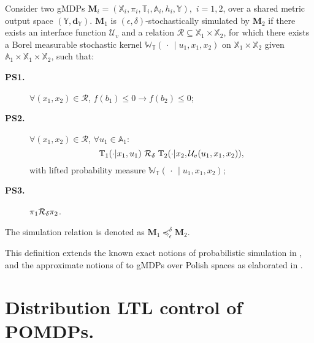 \documentclass{ifacconf}
\newcommand{\X}{{\mathbb{X}}}
\newcommand{\Y}{{\mathbb{Y}}}
\newcommand{\U}{{\mathbb{A}}}
\newcommand{\A}{{\U}}
\newcommand{\InF}{\mathcal{U}_{v}}
\newcommand{\Wt}{\mathbb{W}_{\mathbb{T}}}
\newcommand{\M}{{\mathbf{M}}}
\newcommand{\eps}{\epsilon} \newcommand{\rel}{\mathcal{R}} %
\begin{document}
%
\begin{definition}\label{def:apbsim}
	Consider two gMDPs $\M_i=(\X_i,\pi_i ,\mathbb T_i,\A_i,h_i,\Y),$ $i =1,2$,  over a shared {metric} output space  $(\Y,\mathbf{d}_\Y)$.
	$\M_1$ is $(\epsilon,\delta)$-stochastically simulated by $\M_2$ if there exists an interface function $\InF$ and
	a relation $\rel\subseteq \X_1\times \X_2$, for which there exists a Borel measurable stochastic kernel $\Wt(\,\cdot\,{\mid} u_1,x_1,x_2)$ on $\X_1\times\X_2$ given $\A_1\times\X_1\times\X_2$,
	such that:
	{ \setlength{\parskip}{-2pt}\setlength{\parsep}{-1pt}
		\begin{description}
			\item[\textbf{PS1.}] $\forall (x_1,x_2)\in \rel$,  $f(b_1)\leq0\rightarrow f(b_2)\leq 0$;
			\item[\textbf{PS2.}] $\forall (x_1,x_2)\in \rel$, $\forall u_1\in\A_1$:
			\[\mathbb T_1(\cdot| x_1, u_1)\ \bar \rel_\delta \  \mathbb T_2(\cdot| x_2, \InF(u_1,x_1,x_2)),\] with lifted probability measure $\Wt(\,\cdot\,{\mid}u_1,x_1,x_2)$;
			\item[\textbf{PS3.}] $\pi_1\bar \rel_\delta \pi_2$.
	\end{description} }
	\noindent The simulation relation is denoted as $\M_1\preceq^{\delta}_\eps\M_2$.
\end{definition}
This definition extends the known exact notions of probabilistic simulation in \cite{larsen1991bisimulation},
and the approximate notions of \cite{Desharnais2008,cDAK12} to gMDPs over Polish spaces as elaborated in \cite{haesaert2017verification}.
%




\section{Distribution LTL control of POMDPs. }
\end{document}
